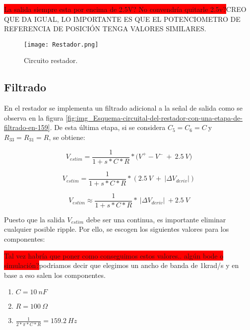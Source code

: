 \colorbox{red}{La salida siempre esta por encima de 2.5V? No convendría quitarle 2.5v?}CREO QUE DA IGUAL, LO IMPORTANTE ES QUE EL POTENCIOMETRO DE REFERENCIA DE POSICIÓN TENGA VALORES SIMILARES.

\begin{figure}[H]
	\centering
	\texttt{[image: Restador.png]}
	\caption{Circuito restador.}
	\label{fig:img_Restador}
\end{figure}

\subsection{Filtrado}

En el restador se implementa un filtrado adicional a la señal de salida como se observa en la figura  \ref{fig:img_Esquema-circuital-del-restador-con-una-etapa-de-filtrado-en-159}. De esta \'{u}ltima etapa, si se considera $C_5=C_6=C\ $y $R_{33}=R_{31}=R$, se obtiene:



\begin{equation}
	V_{estim}=\frac{1}{1+s*C*R}*{(V}^+-V^-\ +\ 2.5\:V)
\end{equation}

\begin{equation} \label{eq_Vestim_1}
	V_{estim}=\frac{1}{1+s*C*R}*(2.5\: V\ +\ |\mathit{\Delta}V_{deriv}|)
\end{equation}

\begin{equation} \label{eq_Vestim_2}
	V_{estim} \approx \frac{1}{1+s*C*R}*\ |\mathit{\Delta}V_{deriv}|\ +2.5\:V
\end{equation}



Puesto que la salida $V_{estim}$ debe ser una continua, es importante eliminar cualquier posible ripple. Por ello, se escogen los siguientes valores para los componentes:

\colorbox{red}{Tal vez habría que poner como conseguimos estos valores.. algún bode o simulación?}podriamos decir que elegimos un ancho de banda de 1krad/s y en base a eso salen los componentes.

\begin{enumerate}
	\item  $C=10\: nF$
	
	\item  $R=100\:\Omega$
	
	\item  $\frac{1}{2*\pi *C*R}=159.2\: Hz$
\end{enumerate}

